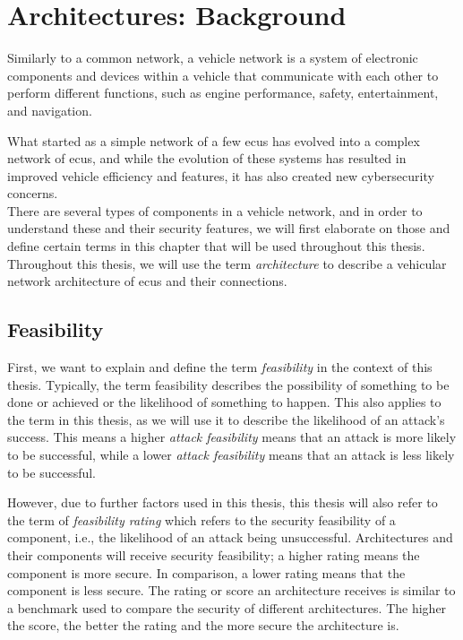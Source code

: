 \chapter{Architectures: Background}
\label{chp:arch}

Similarly to a common network, a vehicle network is a system of electronic components and devices within a vehicle 
that communicate with each other to perform different functions, such as engine performance, safety, entertainment, and navigation. 

What started as a simple network of a few \acrshort{ecu}s has evolved into a complex network of \acrshort{ecu}s,
and while the evolution of these systems has resulted in improved vehicle efficiency and features, 
it has also created new cybersecurity concerns.
\\

There are several types of components in a vehicle network, and in order to understand these and their security features,
we will first elaborate on those and define certain terms in this chapter that will be used throughout this thesis.
Throughout this thesis, we will use the term \textit{architecture} to describe a vehicular network architecture of \acrshort{ecu}s and their connections.

\section{Feasibility}
\label{def:feasibility}

First, we want to explain and define the term \textit{feasibility} in the context of this thesis.
Typically, the term feasibility describes the possibility of something to be done or achieved or the likelihood of something to happen.
This also applies to the term in this thesis, as we will use it to describe the likelihood of an attack's success.
This means a higher \textit{attack feasibility} means that an attack is more likely to be successful, while a lower \textit{attack feasibility} means that an attack is less likely to be successful.

However, due to further factors used in this thesis, this thesis will also refer to the term of \textit{feasibility rating}
which refers to the security feasibility of a component, i.e., the likelihood of an attack being unsuccessful.
Architectures and their components will receive security feasibility; a higher rating means the component is more secure. 
In comparison, a lower rating means that the component is less secure.
The rating or score an architecture receives is similar to a benchmark used to compare the security of different architectures.
The higher the score, the better the rating and the more secure the architecture is.

